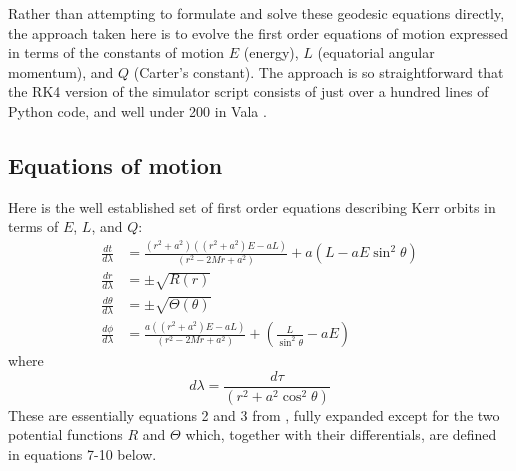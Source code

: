 \documentclass[11pt]{article}
\begin{document}
Rather than attempting to formulate and solve these geodesic equations directly, the approach taken here is to evolve the first order equations of motion expressed in terms of the constants of motion $E$ (energy), $L$ (equatorial angular momentum), and $Q$ (Carter's constant).
The approach is so straightforward that the RK4 version of the simulator script consists of just over a hundred lines of Python code, and well under 200 in Vala \cite{m4r35n357}.

\subsection {Equations of motion}

Here is the well established set of first order equations describing Kerr orbits in terms of $E$, $L$, and $Q$:
\begin{align}
\frac{d t}{d \lambda} &= \frac{(r^2 + a^2) \left((r^2 + a^2) E - aL \right)} {(r^2 - 2Mr  + a^2)} + a(L - aE \sin^2 \theta) \\
\frac{d r}{d \lambda} &= \pm \sqrt {R(r)} \\
\frac{d \theta}{d \lambda} &= \pm \sqrt {\Theta (\theta)} \\
\frac{d \phi}{d \lambda} &= \frac{a \left((r^2 + a^2) E - aL \right)} {(r^2 - 2Mr  + a^2)} + \left(\frac {L} {\sin^2 \theta} -aE \right)
\end{align}
where
\begin{equation}
d \lambda = \frac {d \tau} {(r^2 + a^2 \cos^2\theta)}
\end{equation}
These are essentially equations 2 and 3 from \cite{wilkins}, fully expanded except for the two potential functions $R$ and $\Theta$ which, together with their differentials, are defined in equations 7-10 below.
\end{document}
